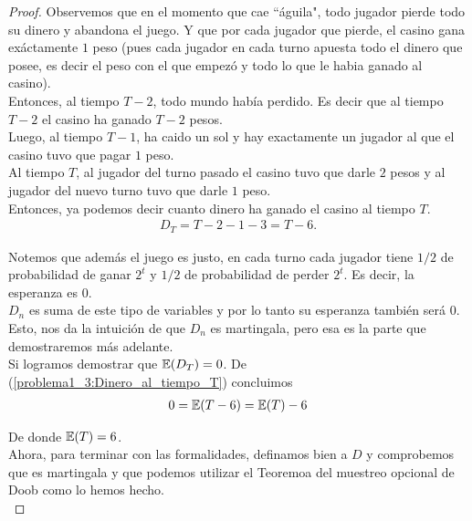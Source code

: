 \begin{proof}
		Observemos que en el momento que cae ``águila", todo jugador pierde todo su dinero y abandona el juego.
		Y que por cada jugador que pierde, el casino gana exáctamente ${1}$ peso (pues cada jugador en cada
		turno apuesta todo el dinero que posee, es decir el peso con el que empezó y todo lo que le habia
		ganado al casino).\\
	   
		Entonces, al tiempo ${T-2}$, todo mundo había perdido. Es decir que al tiempo ${T-2}$ el casino ha ganado
		${T-2}$ pesos.\\
	   
		Luego, al tiempo ${T-1}$, ha caido un sol y hay exactamente un jugador al que el casino tuvo 
		que pagar ${1}$ peso.\\
	   
		Al tiempo ${T}$, al jugador del turno pasado el casino tuvo que darle ${2}$ pesos y al jugador del nuevo
		turno tuvo que darle ${1}$ peso.\\
	   
		Entonces, ya podemos decir cuanto dinero ha ganado el casino al tiempo ${T}$.
		\begin{align}\label{problema1_3:Dinero_al_tiempo_T}
			D_T = T-2 - 1 - 3 = T - 6. 
		\end{align}					   
	   
		Notemos que además el juego es justo, en cada turno cada jugador tiene ${1/2}$ de probabilidad de
		ganar ${2^t}$ y ${1/2}$ de probabilidad de perder ${2^t}$. Es decir, la esperanza es ${0}$.\\
		
		${D_n}$ es suma de este tipo de variables y por lo tanto su esperanza también será ${0}$.\\
	   
		Esto, nos da la intuición de que ${D_n}$ es martingala, pero esa es la parte que demostraremos más adelante.\\
	   
		Si logramos demostrar que ${\mathbb{E}(D_T) = 0}$. De (\ref{problema1_3:Dinero_al_tiempo_T}) concluimos
		\begin{align}
			0 = \mathbb{E}(T - 6) = \mathbb{E}(T) - 6
		\end{align}
		
		De donde ${\mathbb{E}(T) = 6}$.\\
		
		Ahora, para terminar con las formalidades, definamos bien a ${D}$ y comprobemos que es martingala y 
		que podemos utilizar el Teoremoa del muestreo opcional de Doob como lo hemos hecho.\\
		

\end{proof}
